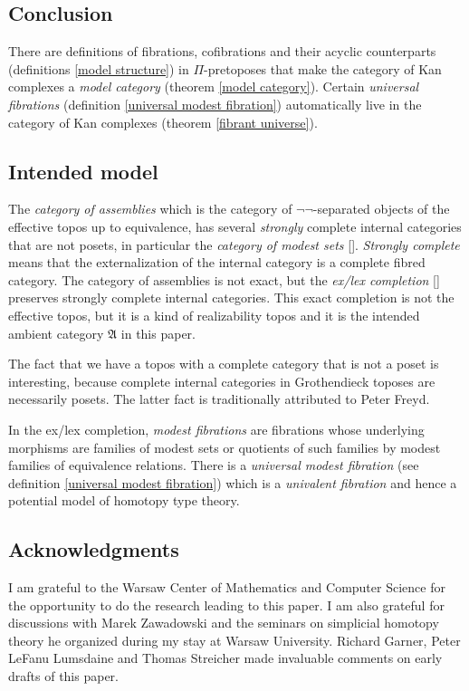 \documentclass{tac}
\newcommand\citep[1]{[\cite{#1}]}
\newcommand\ambient{\mathfrak A}
\begin{document}
\subsection*{Conclusion} There are definitions of fibrations, cofibrations and their acyclic counterparts (definitions \ref{model structure}) in $\Pi$-pretoposes that make the category of Kan complexes a \emph{model category} (theorem \ref{model category}). Certain \emph{universal fibrations} (definition \ref{universal modest fibration}) automatically live in the category of Kan complexes (theorem \ref{fibrant universe}).

\subsection*{Intended model} The \emph{category of assemblies} which is the category of $\neg\neg$-separated objects of the effective topos up to equivalence, has several \emph{strongly} complete internal categories that are not posets, in particular the \emph{category of modest sets} \citep{MR1097022,MR2479466,MR1023803}. \emph{Strongly complete} means that the externalization of the internal category is a complete fibred category. The category of assemblies is not exact, but the \emph{ex/lex completion} \citep{MR1600009} preserves strongly complete internal categories. This exact completion is not the effective topos, but it is a kind of realizability topos and it is the intended ambient category $\ambient$ in this paper. 

The fact that we have a topos with a complete category that is not a poset is interesting, because complete internal categories in Grothendieck toposes are necessarily posets. The latter fact is traditionally attributed to Peter Freyd.

In the ex/lex completion, \emph{modest fibrations} are fibrations whose underlying morphisms are families of modest sets or quotients of such families by modest families of equivalence relations. There is a \emph{universal modest fibration} (see definition \ref{universal modest fibration}) which is a \emph{univalent fibration} and hence a potential model of homotopy type theory.

\subsection*{Acknowledgments} 
I am grateful to the Warsaw Center of Mathematics and Computer Science for the opportunity to do the research leading to this paper. I am also grateful for discussions with Marek Zawadowski and the seminars on simplicial homotopy theory he organized during my stay at Warsaw University. Richard Garner, Peter LeFanu Lumsdaine and Thomas Streicher made invaluable comments on early drafts of this paper.














\printbibliography
\end{document}
